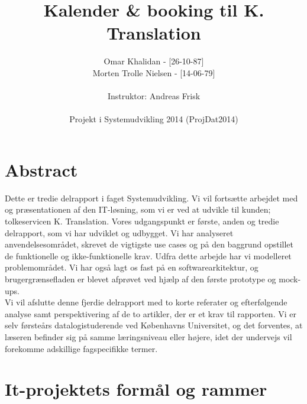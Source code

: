 \documentclass[12pt]{article}   %
\title{Kalender \& booking til K. Translation}
\author{Omar Khalidan - [26-10-87]\\
     Morten Trolle Nielsen - [14-06-79]\\ \\
    Instruktor: Andreas Frisk\\ \\
Projekt i Systemudvikling 2014 (ProjDat2014)}
\begin{document}
\maketitle
\thispagestyle{empty}
\newpage
\tableofcontents
\newpage

\section{Abstract}
Dette er tredie delrapport i faget Systemudvikling. Vi vil fortsætte arbejdet med og præsentationen af den IT-løsning, som vi er ved at udvikle til kunden; tolkeservicen K. Translation. Vores udgangspunkt er første, anden og tredie delrapport, som vi har udviklet og udbygget. Vi har analyseret anvendelsesområdet, skrevet de vigtigste use cases og på den baggrund opstillet de funktionelle og ikke-funktionelle krav. Udfra dette arbejde har vi modelleret problemområdet. Vi har også lagt os fast på en softwarearkitektur, og brugergrænsefladen er blevet afprøvet ved hjælp af den første prototype og mock-ups.  \\
Vi vil afslutte denne fjerdie delrapport med to korte referater og efterfølgende analyse samt perspektivering af de to artikler, der er et krav til rapporten. Vi er selv førsteårs datalogistuderende ved Københavns Universitet, og det forventes, at læseren befinder sig på samme læringsniveau eller højere, idet der undervejs vil forekomme adskillige fagspecifikke termer. 

\newpage

\section{It-projektets formål og rammer}
\end{document}
